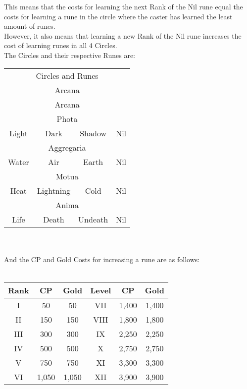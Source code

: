 This means that the costs for learning the next Rank of the Nil rune equal the costs for learning a rune in the circle where the caster has learned the least amount of runes.\\

However, it also means that learning a new Rank of the Nil rune increases the cost of learning runes in all 4 Circles.\\

The Circles and their respective Runes are:

\begin{tabular}{c | c | c | c}
	\multicolumn{4}{c}{Circles and Runes}\\
	\multicolumn{4}{c}{Arcana} \\
	\multicolumn{4}{c}{Arcana} \\
	\hline
	\hline
	\multicolumn{4}{c}{Phota}\\
	Light & Dark & Shadow & Nil\\
	\hline
	\hline
	\multicolumn{4}{c}{Aggregaria}\\
	Water & Air & Earth & Nil\\
	\hline
	\hline
	\multicolumn{4}{c}{Motua}\\
	Heat & Lightning & Cold & Nil\\
	\hline
	\hline
	\multicolumn{4}{c}{Anima}\\
	Life & Death & Undeath & Nil\\
\end{tabular}
\\
\\
And the CP and Gold Costs for increasing a rune are as follows:
\\
\\
\begin{tabular}{c | c | c || c | c | c}
	Rank & CP & Gold & Level & CP & Gold \\ \hline
	I & 50 & 50 & VII & 1,400 & 1,400 \\
	II & 150 & 150 & VIII & 1,800 & 1,800 \\
	III & 300 & 300 & IX & 2,250 & 2,250 \\
	IV & 500 & 500 & X & 2,750 & 2,750 \\
	V & 750 & 750 & XI & 3,300 & 3,300 \\
	VI & 1,050 & 1,050 & XII & 3,900 & 3,900 \\
\end{tabular}

	
	
